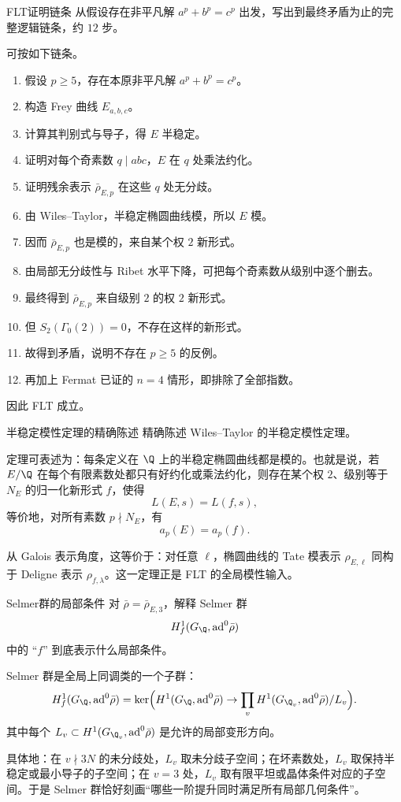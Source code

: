 \begin{problem}{FLT证明链条}
从假设存在非平凡解 $a^p+b^p=c^p$ 出发，写出到最终矛盾为止的完整逻辑链条，约 $12$ 步。
\end{problem}
\begin{solution}
可按如下链条。
\begin{enumerate}[label=\arabic*.]
  \item 假设 $p\ge5$，存在本原非平凡解 $a^p+b^p=c^p$。
  \item 构造 Frey 曲线 $E_{a,b,c}$。
  \item 计算其判别式与导子，得 $E$ 半稳定。
  \item 证明对每个奇素数 $q\mid abc$，$E$ 在 $q$ 处乘法约化。
  \item 证明残余表示 $\bar\rho_{E,p}$ 在这些 $q$ 处无分歧。
  \item 由 Wiles--Taylor，半稳定椭圆曲线模，所以 $E$ 模。
  \item 因而 $\bar\rho_{E,p}$ 也是模的，来自某个权 $2$ 新形式。
  \item 由局部无分歧性与 Ribet 水平下降，可把每个奇素数从级别中逐个删去。
  \item 最终得到 $\bar\rho_{E,p}$ 来自级别 $2$ 的权 $2$ 新形式。
  \item 但 $S_2(\Gamma_0(2))=0$，不存在这样的新形式。
  \item 故得到矛盾，说明不存在 $p\ge5$ 的反例。
  \item 再加上 Fermat 已证的 $n=4$ 情形，即排除了全部指数。
\end{enumerate}
因此 FLT 成立。
\end{solution}

\begin{problem}{半稳定模性定理的精确陈述}
精确陈述 Wiles--Taylor 的半稳定模性定理。
\end{problem}
\begin{solution}
定理可表述为：每条定义在 $\Q$ 上的半稳定椭圆曲线都是模的。也就是说，若 $E/\Q$ 在每个有限素数处都只有好约化或乘法约化，则存在某个权 $2$、级别等于 $N_E$ 的归一化新形式 $f$，使得
\[
L(E,s)=L(f,s),
\]
等价地，对所有素数 $p\nmid N_E$，有
\[
a_p(E)=a_p(f).
\]

从 Galois 表示角度，这等价于：对任意 $\ell$，椭圆曲线的 Tate 模表示 $\rho_{E,\ell}$ 同构于 Deligne 表示 $\rho_{f,\lambda}$。这一定理正是 FLT 的全局模性输入。
\end{solution}

\begin{problem}{Selmer群的局部条件}
对 $\bar\rho=\bar\rho_{E,3}$，解释 Selmer 群
\[
H^1_f(G_\Q,\mathrm{ad}^0\bar\rho)
\]
中的 ``$f$'' 到底表示什么局部条件。
\end{problem}
\begin{solution}
Selmer 群是全局上同调类的一个子群：
\[
H^1_f(G_\Q,\mathrm{ad}^0\bar\rho)
=\ker\Bigl(H^1(G_\Q,\mathrm{ad}^0\bar\rho)\to \prod_v H^1(G_{\Q_v},\mathrm{ad}^0\bar\rho)/L_v\Bigr).
\]
其中每个 $L_v\subset H^1(G_{\Q_v},\mathrm{ad}^0\bar\rho)$ 是允许的局部变形方向。

具体地：在 $v\nmid3N$ 的未分歧处，$L_v$ 取未分歧子空间；在坏素数处，$L_v$ 取保持半稳定或最小导子的子空间；在 $v=3$ 处，$L_v$ 取有限平坦或晶体条件对应的子空间。于是 Selmer 群恰好刻画“哪些一阶提升同时满足所有局部几何条件”。
\end{solution}

